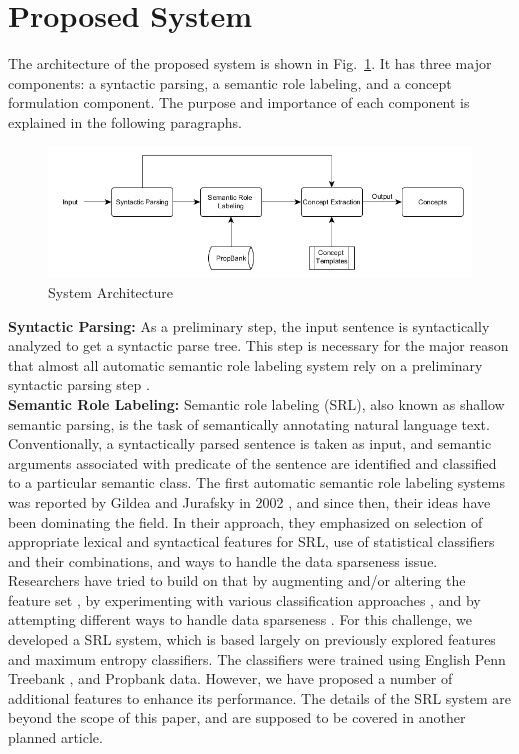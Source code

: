 \documentclass[runningheads,a4paper]{llncs}
\begin{document}
\section{Proposed System}
The architecture of the proposed system is shown in Fig.~\ref{fig:sys-archi}. It has three major components: a syntactic parsing, a semantic role labeling, and a concept formulation component. The purpose and importance of each component is explained in the following paragraphs.\\[0.3cm]
\begin{figure}[!h]
\centering
\includegraphics[width=.9\textwidth]{system-archi2.png}
\caption{System Architecture}
\label{fig:sys-archi}
\end{figure}
\textbf{Syntactic Parsing:} As a preliminary step, the input sentence is syntactically analyzed to get a syntactic parse tree. This step is necessary for the major reason that almost all automatic semantic role labeling system rely on a preliminary syntactic parsing step \cite{johansson}. \\[.3cm]
\textbf{Semantic Role Labeling:} Semantic role labeling (SRL), also known as shallow semantic parsing, is the task of semantically annotating natural language text. Conventionally, a syntactically parsed sentence is taken as input, and semantic arguments associated with predicate of the sentence are identified and classified to a particular semantic class. The first automatic semantic role labeling systems was reported by Gildea and Jurafsky in 2002 \cite{gildea}, and since then, their ideas have been dominating the field. In their approach, they emphasized on selection of appropriate lexical and syntactical features for SRL, use of statistical classifiers and their combinations, and ways to handle the data sparseness issue. Researchers have tried to build on that by augmenting and/or altering the feature set \cite{nianwen-2004}, by experimenting with various classification approaches \cite{pradan,park-2005}, and by attempting different ways to handle data sparseness \cite{zeprian}. For this challenge, we developed a SRL system, which is based largely on previously explored features and maximum entropy classifiers. The classifiers were trained using English Penn Treebank \cite{penn}, and Propbank \cite{propbank} data. However, we have proposed a number of additional features to enhance its performance. The details of the SRL system are beyond the scope of this paper, and are supposed to be covered in another planned article.  \\[0.3cm]   
\end{document}
